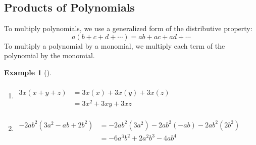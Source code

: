 \documentclass[10pt,]{book}
\theoremstyle{plain}
\theoremstyle{definition}
\theoremstyle{definition}
\newtheorem{example}[theorem]{Example}
\theoremstyle{definition}
\numberwithin{equation}{part}
\newcommand{\amp}{&}
\begin{document}
\subsection[{Products of Polynomials}]{Products of Polynomials}\label{subsection-27}
To multiply polynomials, we use a generalized form of the distributive property:%
\begin{equation*}
a(b + c + d + \cdots) = ab + ac + ad + \cdots
\end{equation*}
To multiply a polynomial by a monomial, we multiply each term of the polynomial by the monomial.%
\begin{example}[]\label{example-44}
\leavevmode%
\begin{enumerate}[label=*\alph**]
\item\hypertarget{li-228}{}\(\begin{aligned}
\amp\\
3x(x + y + z) \amp = 3x(x) + 3x(y) + 3x(z)\\
\amp = 3x^2+3xy+3xz
\end{aligned}\)%
\item\hypertarget{li-229}{}\(\begin{aligned}
\amp\\
−2ab^2(3a^2 − ab + 2b^2) \amp = −2ab^2(3a^2) − 2ab^2(−ab) − 2ab^2(2b^2)\\
\amp = -6a^3b^2+2a^2b^3-4ab^4
\end{aligned}\)%
\end{enumerate}
%
\end{example}
\typeout{************************************************}
\typeout{************************************************}
\end{document}
